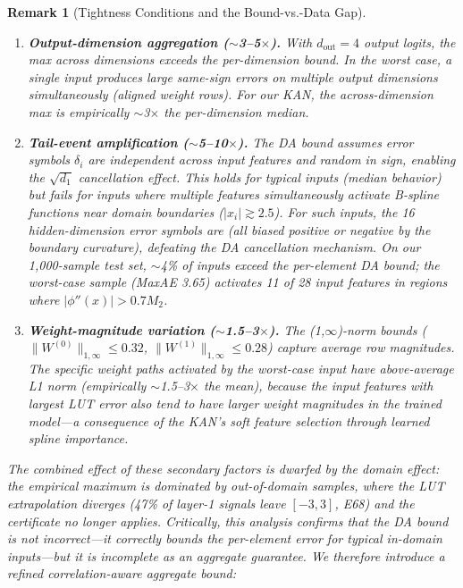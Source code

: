 \documentclass[journal,onecolumn]{IEEEtran}
\newtheorem{remark}{Remark}
\begin{document}
\begin{remark}[Tightness Conditions and the Bound-vs.-Data Gap]
\begin{enumerate}
    \item \textbf{Output-dimension aggregation ($\sim$3--5$\times$).}
         With $d_{\text{out}} = 4$ output logits, the max across dimensions
         exceeds the per-dimension bound. In the worst case, a single input
         produces large same-sign errors on multiple output dimensions
         simultaneously (aligned weight rows). For our KAN, the
         across-dimension max is empirically $\sim$3$\times$ the per-dimension
         median.

    \item \textbf{Tail-event amplification ($\sim$5--10$\times$).}
         The DA bound assumes error symbols $\delta_i$ are independent across
         input features and random in sign, enabling the $\sqrt{d_1}$
         cancellation effect. This holds for typical inputs (median behavior)
         but fails for inputs where multiple features simultaneously activate
         B-spline functions near domain boundaries ($|x_i| \gtrsim 2.5$). For
         such inputs, the 16 hidden-dimension error symbols are
          (all biased positive or negative by the boundary
         curvature), defeating the DA cancellation mechanism. On our 1,000-sample
         test set, $\sim$4\% of inputs exceed the per-element DA bound; the
         worst-case sample (MaxAE 3.65) activates 11 of 28 input features in
         regions where $|\phi''(x)| > 0.7 M_2$.

    \item \textbf{Weight-magnitude variation ($\sim$1.5--3$\times$).}
         The (1,$\infty$)-norm bounds ($\|W^{(0)}\|_{1,\infty} \leq 0.32$,
          $\|W^{(1)}\|_{1,\infty} \leq 0.28$) capture average row magnitudes.
         The specific weight paths activated by the worst-case input have
         above-average L1 norm (empirically $\sim$1.5--3$\times$ the mean),
         because the input features with largest LUT error also tend to have
         larger weight magnitudes in the trained model---a consequence of the
         KAN's soft feature selection through learned spline importance.
\end{enumerate}

The combined effect of these secondary factors is dwarfed by the domain
effect: the empirical maximum is dominated by out-of-domain samples,
where the LUT extrapolation diverges (47\% of layer-1 signals leave
$[-3,3]$, E68) and the certificate no longer applies. Critically, this
analysis confirms that the DA bound is not
\textit{incorrect}---it correctly bounds the per-element error for typical
in-domain inputs---but it is incomplete as an aggregate guarantee. We therefore
introduce a refined correlation-aware aggregate bound:


\end{remark}
\end{document}
